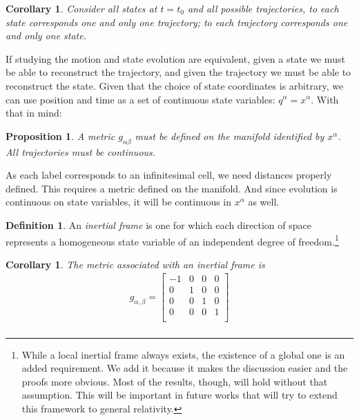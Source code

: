 \documentclass[aps,pra,10pt,twocolumn,floatfix,nofootinbib]{revtex4-1}
\newtheorem{cor}[thm]{Corollary}
\newtheorem{prop}[thm]{Proposition}
\theoremstyle{definition}
\newtheorem{defn}[thm]{Definition}
\begin{document}
\begin{cor}\label{}
Consider all states at $t=t_0$ and all possible trajectories, to each state corresponds one and only one trajectory; to each trajectory corresponds one and only one state.
\end{cor}

If studying the motion and state evolution are equivalent, given a state we must be able to reconstruct the trajectory, and given the trajectory we must be able to reconstruct the state. Given that the choice of state coordinates is arbitrary, we can use position and time as a set of continuous state variables: $q^\alpha = x^\alpha$. With that in mind:

\begin{prop}\label{}
A metric $g_{\alpha\beta}$ must be defined on the manifold identified by $x^\alpha$. All trajectories must be continuous.
\end{prop}

As each label corresponds to an infinitesimal cell, we need distances properly defined. This requires a metric defined on the manifold. And since evolution is continuous on state variables, it will be continuous in $x^\alpha$ as well.

\begin{defn}\label{continuousLabels}
An \emph{inertial frame} is one for which each direction of space represents a homogeneous state variable of an independent degree of freedom.\footnote{While a local inertial frame always exists, the existence of a global one is an added requirement. We add it because it makes the discussion easier and the proofs more obvious. Most of the results, though, will hold without that assumption. This will be important in future works that will try to extend this framework to general relativity.}
\end{defn}

\begin{cor}\label{continuousLabels}
The metric associated with an inertial frame is
\begin{align*}
g_{\alpha, \beta} =  \left[
  \begin{array}{cccc}
    -1 & 0 & 0 & 0 \\
    0 & 1 & 0 & 0 \\
    0 & 0 & 1 & 0 \\
    0 & 0 & 0 & 1 \\
  \end{array}
\right] \\
\end{align*}
\end{cor}
\end{document}
